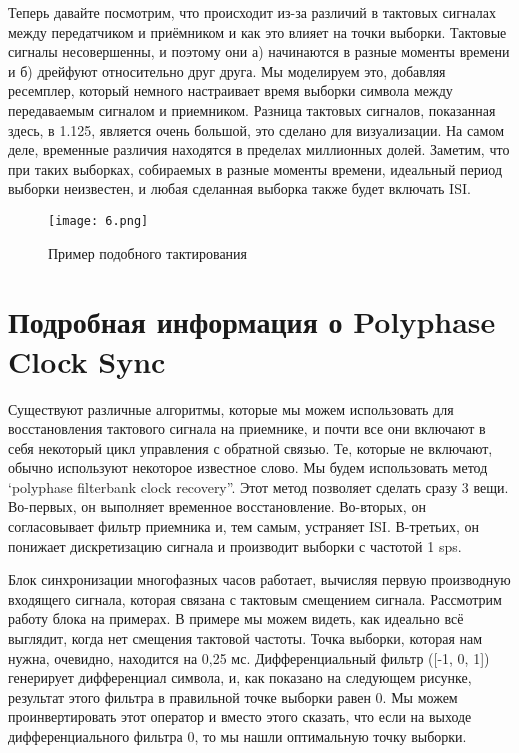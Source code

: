 \documentclass[a4paper,12pt]{report}
\begin{document}
Теперь давайте посмотрим, что происходит из-за различий в тактовых сигналах между передатчиком и приёмником и как это влияет на точки выборки. Тактовые сигналы несовершенны, и поэтому они а) начинаются в разные моменты времени и б) дрейфуют относительно друг друга. Мы моделируем это, добавляя ресемплер, который немного настраивает время выборки символа между передаваемым сигналом и приемником. Разница тактовых сигналов, показанная здесь, в 1.125, является очень большой, это сделано для визуализации. На самом деле, временные различия находятся в пределах миллионных долей. Заметим, что при таких выборках, собираемых в разные моменты времени, идеальный период выборки неизвестен, и любая сделанная выборка также будет включать ISI. 

\begin{figure}[H]
        \centering
        \texttt{[image: 6.png]}
        \caption{Пример подобного тактирования}
        \label{fig:ig4_1}
\end{figure}

\section{Подробная информация о Polyphase Clock Sync}

Существуют различные алгоритмы, которые мы можем использовать для восстановления тактового сигнала на приемнике, и почти все они включают в себя некоторый цикл управления с обратной связью. Те, которые не включают, обычно используют некоторое известное слово. Мы будем использовать метод ‘polyphase filterbank clock recovery”. Этот метод позволяет сделать сразу 3 вещи. Во-первых, он выполняет временное восстановление. Во-вторых, он согласовывает фильтр приемника и, тем самым, устраняет ISI. В-третьих, он понижает дискретизацию сигнала и производит выборки с частотой 1 sps. 

Блок синхронизации многофазных часов работает, вычисляя первую производную входящего сигнала, которая связана с тактовым смещением сигнала. Рассмотрим работу блока на примерах. В примере мы можем видеть, как идеально всё выглядит, когда нет смещения тактовой частоты. Точка выборки, которая нам нужна, очевидно, находится на 0,25 мс. Дифференциальный фильтр ([-1, 0, 1]) генерирует дифференциал символа, и, как показано на следующем рисунке, результат этого фильтра в правильной точке выборки равен 0. Мы можем проинвертировать этот оператор и вместо этого сказать, что если на выходе дифференциального фильтра 0, то мы нашли оптимальную точку выборки.
\end{document}
